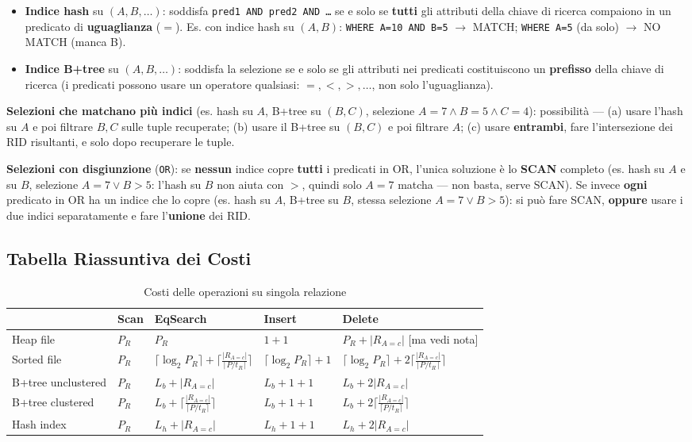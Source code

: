 \documentclass[12pt, a4paper]{article}
\begin{document}
\begin{itemize}
    \item \textbf{Indice hash} su $(A,B,\ldots)$: soddisfa \texttt{pred1 AND pred2 AND \ldots} se e solo se \textbf{tutti} gli attributi della chiave di ricerca compaiono in un predicato di \textbf{uguaglianza} ($=$). Es. con indice hash su $(A,B)$: \texttt{WHERE A=10 AND B=5} $\to$ MATCH; \texttt{WHERE A=5} (da solo) $\to$ NO MATCH (manca B).
    \item \textbf{Indice B+tree} su $(A,B,\ldots)$: soddisfa la selezione se e solo se gli attributi nei predicati costituiscono un \textbf{prefisso} della chiave di ricerca (i predicati possono usare un operatore qualsiasi: $=,<,>,\ldots$, non solo l'uguaglianza).
\end{itemize}

\textbf{Selezioni che matchano più indici} (es. hash su $A$, B+tree su $(B,C)$, selezione $A{=}7 \wedge B{=}5 \wedge C{=}4$): possibilità — (a) usare l'hash su $A$ e poi filtrare $B,C$ sulle tuple recuperate; (b) usare il B+tree su $(B,C)$ e poi filtrare $A$; (c) usare \textbf{entrambi}, fare l'intersezione dei RID risultanti, e solo dopo recuperare le tuple.

\textbf{Selezioni con disgiunzione} (\texttt{OR}): se \textbf{nessun} indice copre \textbf{tutti} i predicati in OR, l'unica soluzione è lo \textbf{SCAN} completo (es. hash su $A$ e su $B$, selezione $A{=}7 \vee B{>}5$: l'hash su $B$ non aiuta con $>$, quindi solo $A{=}7$ matcha — non basta, serve SCAN). Se invece \textbf{ogni} predicato in OR ha un indice che lo copre (es. hash su $A$, B+tree su $B$, stessa selezione $A{=}7 \vee B{>}5$): si può fare SCAN, \textbf{oppure} usare i due indici separatamente e fare l'\textbf{unione} dei RID.

\subsection{Tabella Riassuntiva dei Costi}

\begin{table}[H]
\centering
\small
\begin{tabular}{@{}lllll@{}}
\toprule
 & \textbf{Scan} & \textbf{EqSearch} & \textbf{Insert} & \textbf{Delete} \\
\midrule
Heap file & $P_R$ & $P_R$ & $1+1$ & $P_R + |R_{A=c}|$ {\scriptsize[ma vedi nota]} \\
Sorted file & $P_R$ & $\lceil\log_2 P_R\rceil + \lceil\frac{|R_{A=c}|}{\lceil P/t_R\rceil}\rceil$ & $\lceil\log_2 P_R\rceil+1$ & $\lceil\log_2 P_R\rceil + 2\lceil\frac{|R_{A=c}|}{\lceil P/t_R\rceil}\rceil$ \\
B+tree unclustered & $P_R$ & $L_b + |R_{A=c}|$ & $L_b+1+1$ & $L_b + 2|R_{A=c}|$ \\
B+tree clustered & $P_R$ & $L_b + \lceil\frac{|R_{A=c}|}{\lceil P/t_R\rceil}\rceil$ & $L_b+1+1$ & $L_b + 2\lceil\frac{|R_{A=c}|}{\lceil P/t_R\rceil}\rceil$ \\
Hash index & $P_R$ & $L_h + |R_{A=c}|$ & $L_h+1+1$ & $L_h + 2|R_{A=c}|$ \\
\bottomrule
\end{tabular}
\caption{Costi delle operazioni su singola relazione}
\end{table}
\end{document}

